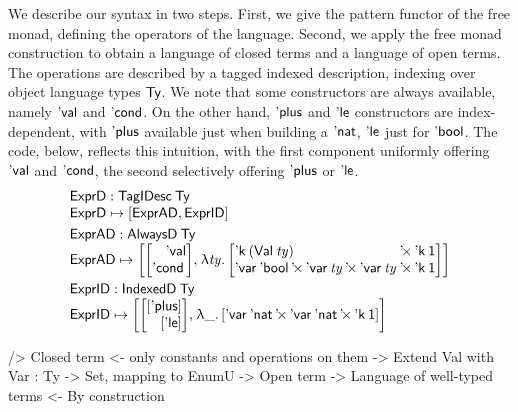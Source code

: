 We describe our syntax in two steps. First, we give the pattern
functor of the free monad, defining the operators of the
language. Second, we apply the free monad construction to obtain a
language of closed terms and a language of open terms. The operations
are described by a tagged indexed description, indexing over object
language types $\Ty$. We note that some constructors are always
available, namely $\SYMBEval$ and $\SYMBEcond$. On the other hand,
$\SYMBEplus$ and $\SYMBEle$ constructors are index-dependent, with
$\SYMBEplus$ available just when building a $\Enat$, $\SYMBEle$ just
for $\Ebool$. The code, below, reflects this intuition, with the first
component uniformly offering $\SYMBEval$ and $\SYMBEcond$, the second
selectively offering $\SYMBEplus$ or $\SYMBEle$.
%
%
\[\stk{
\stk{
\HExprD : \TagIDesc{\Ty} \\
\HExprD \mapsto \sqr{ \HExprAD , \HExprID } \\
} \smallskip\\
\stk{
\HExprAD : \ATagIDesc{\Ty} \\
\HExprAD \mapsto \vtup{l}{
   {\vtup{r}{\SYMBEval\\ \SYMBEcond \,}} \red{,} \;
      \LAM{\V{ty}}
      \vtup{l@{\:}l}{
      \DProd{\DConst{(\Val{\V{ty}})}&}{\DConst{\Unit}} \\
      \DProd{\DProd{\DVar{\Ebool}}{\DProd{\DVar{\V{ty}}}{\DVar{\V{ty}}}}&}
        {\DConst{\Unit}} \\
     }
   }
\smallskip\\
} 
\\
\stk{
\HExprID : \ITagIDesc{\Ty} \\
\HExprID \mapsto \vtup{l}{
                   \vtup{r}{\sqr{\SYMBEplus} \\ \sqr{\SYMBEle}} \red{,} \;
  \LAM{\_} \sqr{\DProd{\DProd{\DVar{\Enat}}{\DVar{\Enat}}}{\DConst{\Unit}}}
                   }
}
}\]



\begin{wstructure}
    /> Closed term
        <- only constants and operations on them
        -> Extend Val with Var : Ty -> Set, mapping to EnumU
            -> Open term
            -> Language of well-typed terms
                <- By construction
\end{wstructure}


